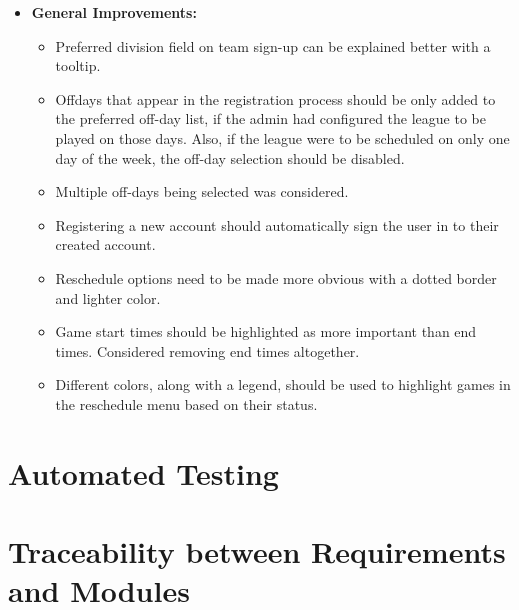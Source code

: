 \documentclass[12pt, titlepage]{article}
\begin{document}
\begin{itemize}
  \item \textbf{General Improvements:}
  \begin{itemize}
    \item Preferred division field on team sign-up can be explained better with a tooltip.
    \item Offdays that appear in the registration process should be only added to the preferred off-day
    list, if the admin had configured the league to be played on those days. Also, if the league were
    to be scheduled on only one day of the week, the off-day selection should be disabled.
    \item Multiple off-days being selected was considered.
    \item Registering a new account should automatically sign the user in to their created account.
    \item Reschedule options need to be made more obvious with a dotted border and lighter color.
    \item Game start times should be highlighted as more important than end times. Considered removing
    end times altogether.
    \item Different colors, along with a legend, should be used to highlight games in the reschedule
    menu based on their status.
  \end{itemize}
\end{itemize}

\section{Automated Testing}
		
\section{Traceability between Requirements and Modules}
		
\end{document}
